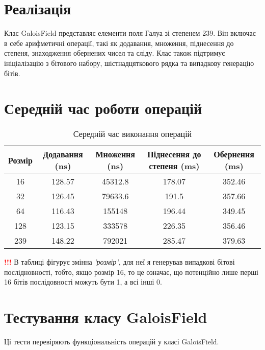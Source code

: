 \documentclass{article}
\begin{document}
\newpage
\section{Реалізація}
\quad Клас GaloisField представляє елементи поля Галуа зі степенем 239. Він включає в себе арифметичні операції, такі як додавання, множення, піднесення до степеня, знаходження обернених чисел та сліду. Клас також підтримує ініціалізацію з бітового набору, шістнадцяткового рядка та випадкову генерацію бітів.

\section{Середній час роботи операцій}
\quad
\begin{table}[h]
\centering
\begin{tabular}{|c|c|c|c|c|}
\hline
\textbf{Розмір} & \textbf{Додавання (ns)} & \textbf{Множення (ns)} & \textbf{Піднесення до степеня (ms)} & \textbf{Обернення (ms)} \\
\hline
16 & 128.57 & 45312.8 & 178.07 & 352.46 \\
32 & 126.45 & 79633.6 & 191.5 & 357.66 \\
64 & 116.43 & 155148 & 196.44 & 349.45 \\
128 & 123.15 & 333578 & 226.35 & 356.46 \\
239 & 148.22 & 792021 & 285.47 & 379.63 \\
\hline
\end{tabular}
\caption{Середній час виконання операцій}
\label{tab:comparison}
\end{table}

\quad \textcolor{red}{\textbf{!!!}} В таблиці фігурує змінна \textit{'розмір'}, для неї я генерував випадкові бітові послідновності, тобто, якщо розмір 16, то це означає, що потенційно лише перші 16 бітів послідовності можуть бути 1, а всі інші 0.

\section{Тестування класу GaloisField}

Ці тести перевіряють функціональність операцій у класі GaloisField.
\end{document}
